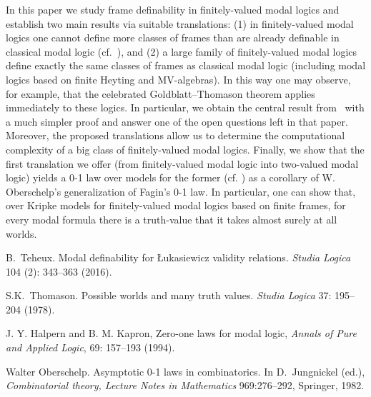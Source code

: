 In this paper we study frame definability in finitely-valued modal logics and establish two main results via suitable translations: (1) in finitely-valued modal logics one cannot define more classes of frames than are already definable in classical modal logic (cf.~\cite[Thm.~8]{tho}), and (2)  a large family of finitely-valued modal logics define exactly the same classes of frames as classical modal logic (including modal logics based on finite Heyting and MV-algebras). In this way one may observe, for example, that the celebrated Goldblatt--Thomason theorem applies immediately to these logics. In particular, we obtain the central result from~\cite{te} with a much simpler proof  and answer one of the open questions left in that paper. Moreover, the proposed translations allow us to determine the computational complexity of a big class of finitely-valued modal logics. Finally, we show that the first translation we offer  (from finitely-valued modal logic into two-valued modal logic) yields a  0-1 law over models for the former (cf. \cite{kapron1}) as a corollary of W. Oberschelp's generalization \cite{ober} of  Fagin's 0-1 law. In particular, one can show that, over Kripke models for finitely-valued modal logics based on finite frames, for every modal formula  there is a truth-value that it takes almost surely at all worlds.

%
\begin{thebibliography}{10}
%
%

B.~Teheux. Modal definability for \L ukasiewicz validity relations. \emph{Studia Logica} 104 (2): 343--363 (2016).

S.K.~Thomason. Possible worlds and many truth values. \emph{Studia Logica} 37: 195--204 (1978).

J. Y. Halpern and B. M. Kapron, Zero-one laws for modal logic,
\emph{Annals of Pure and Applied Logic}, 69: 157–193 (1994).


Walter Oberschelp. Asymptotic 0-1 laws in combinatorics. In D.~Jungnickel (ed.), \emph{Combinatorial theory, Lecture Notes in Mathematics} 969:276--292, Springer, 1982.


\end{thebibliography}
